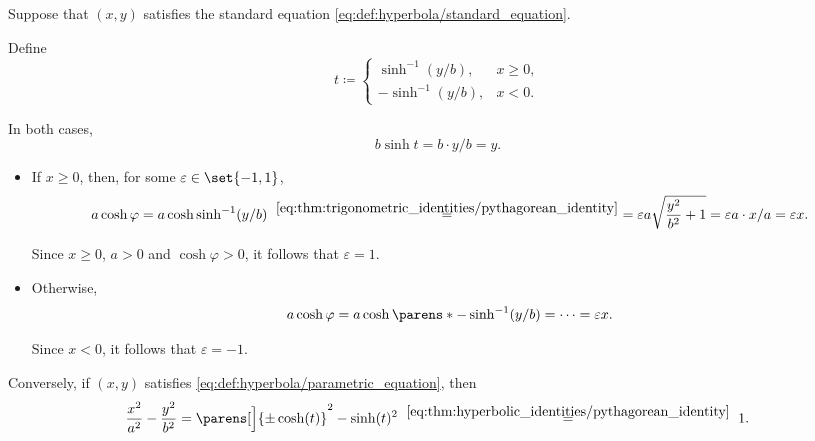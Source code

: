 \begin{defproof}
   Suppose that \( (x, y) \) satisfies the standard equation \eqref{eq:def:hyperbola/standard_equation}.

  Define
  \begin{equation*}
    t \coloneqq \begin{cases}
      \hyperref[eq:thm:hyperbolic_identities/inverse/sinh]{\sinh^{-1}}(y / b), &x \geq 0, \\
      -\sinh^{-1}(y / b),                                                      &x < 0.
    \end{cases}
  \end{equation*}

  In both cases,
  \begin{equation*}
    b \sinh t = b \cdot y / b = y.
  \end{equation*}

  \begin{itemize}
    \item If \( x \geq 0 \), then, for some \( \varepsilon \in \set{ -1, 1 } \),
    \begin{equation*}
      a \cosh\varphi
      =
      a \cosh\sinh^{-1}(y / b)
      \reloset {\eqref{eq:thm:trigonometric_identities/pythagorean_identity}} =
      =
      \varepsilon a \sqrt{ \frac {y^2} {b^2} + 1 }
      =
      \varepsilon a \cdot x / a
      =
      \varepsilon x.
    \end{equation*}

    Since \( x \geq 0 \), \( a > 0 \) and \( \cosh\varphi > 0 \), it follows that \( \varepsilon = 1 \).

    \item Otherwise,
    \begin{equation*}
      a \cosh\varphi
      =
      a \cosh\parens*{ -\sinh^{-1}(y / b) }
      =
      \cdots
      =
      \varepsilon x.
    \end{equation*}

    Since \( x < 0 \), it follows that \( \varepsilon = -1 \).
  \end{itemize}

   Conversely, if \( (x, y) \) satisfies \eqref{eq:def:hyperbola/parametric_equation}, then
  \begin{equation*}
    \frac {x^2} {a^2} - \frac {y^2} {b^2}
    =
    \parens[\Big]{ \pm \cosh(t) }^2 - \sinh(t)^2
    \reloset {\eqref{eq:thm:hyperbolic_identities/pythagorean_identity}} =
    1.
  \end{equation*}


\end{defproof}
